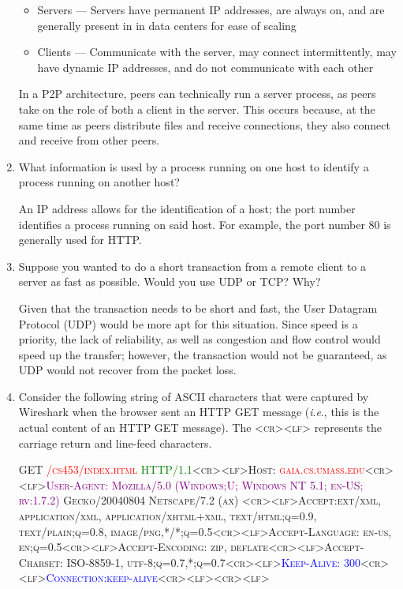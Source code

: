 \begin{enumerate}
    \begin{itemize}

      \item Servers — Servers have permanent IP addresses, are always on, and are generally present in in data centers for ease of scaling

      \item Clients — Communicate with the server, may connect intermittently, may have dynamic IP addresses, and do not communicate with each other

    \end{itemize}

    In a P2P architecture, peers can technically run a server process, as peers take on the role of both a client in the server. This occurs because, at the same time as peers distribute files and receive connections, they also connect and receive from other peers.
    
  \item What information is used by a process running on one host to identify a process running on another host?

    An IP address allows for the identification of a host; the port number identifies a process running on said host. For example, the port number 80 is generally used for HTTP.
    
  \item Suppose you wanted to do a short transaction from a remote client to a server as fast as possible. Would you use UDP or TCP? Why?

    Given that the transaction needs to be short and fast, the User Datagram Protocol (UDP) would be more apt for this situation. Since speed is a priority, the lack of reliability, as well as congestion and flow control would speed up the transfer; however, the transaction would not be guaranteed, as UDP would not recover from the packet loss.
    
  \item Consider the following string of ASCII characters that were captured by Wireshark when the browser sent an HTTP GET message (\textit{i}.\textit{e}., this is the actual content of an HTTP GET message). The \textsc{<cr><lf>} represents the carriage return and line-feed characters.

    \begin{flushleft}
      \textsc{GET \textcolor{red}{/cs453/index.html} \textcolor{green}{HTTP/1.1}<cr><lf>Host: \textcolor{red}{gaia.cs.umass.edu}<cr><lf>\textcolor{purple}{User-Agent: Mozilla/5.0 (Windows;U; Windows NT 5.1; en-US; rv:1.7.2)} Gecko/20040804 Netscape/7.2 (ax) <cr><lf>Accept:ext/xml, application/xml, application/xhtml+xml, text/html;q=0.9, text/plain;q=0.8, image/png,*/*;q=0.5<cr><lf>Accept-Language: en-us, en;q=0.5<cr><lf>Accept-Encoding: zip, deflate<cr><lf>Accept-Charset: ISO-8859-1, utf-8;q=0.7,*;q=0.7<cr><lf>\textcolor{blue}{Keep-Alive: 300}<cr><lf>\textcolor{blue}{Connection:keep-alive}<cr><lf><cr><lf>}
    \end{flushleft}


\end{enumerate}
